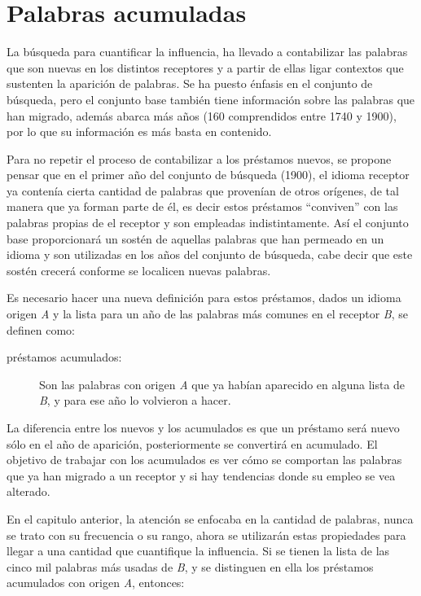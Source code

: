 \chapter{Palabras acumuladas}

La búsqueda para cuantificar la influencia, ha llevado a contabilizar las palabras que son nuevas en los distintos receptores y a partir de ellas ligar contextos que sustenten la aparición de palabras.  Se ha puesto énfasis en el conjunto de búsqueda, pero  el conjunto base  también tiene información sobre las palabras que han migrado, además  abarca más años (160 comprendidos entre 1740 y 1900), por lo que su información es más basta en contenido. 

Para no repetir el proceso de contabilizar a los préstamos nuevos,  se propone pensar que en el primer año del conjunto de búsqueda (1900),  el idioma receptor ya contenía cierta cantidad de palabras que provenían de otros orígenes,  de tal manera que ya forman parte de él, es decir estos préstamos ``conviven'' con las palabras propias de el receptor y son empleadas indistintamente. Así el conjunto base proporcionará un sostén de aquellas palabras que han permeado en un idioma y son utilizadas en los años del conjunto de búsqueda,  cabe decir que este sostén crecerá conforme se localicen nuevas palabras. 

Es necesario hacer una nueva definición para estos préstamos, dados un idioma  origen  \textit{A} y la lista para un año  de las palabras más comunes en el receptor \textit{B}, se definen como: 

\begin{description}
	\item[préstamos acumulados:] Son las palabras con origen \textit{A} que ya habían aparecido en alguna lista de \textit{B}, y para ese año lo volvieron a hacer.  
\end{description}

La diferencia entre los nuevos y los acumulados es que un préstamo será nuevo sólo en el año de aparición, posteriormente se convertirá en acumulado. El objetivo  de trabajar con los acumulados es ver cómo se comportan las palabras que ya han migrado a un receptor y si hay tendencias donde su empleo se vea alterado.  

En el capitulo anterior, la atención se enfocaba en la cantidad de palabras, nunca se trato con su frecuencia o su rango, ahora se utilizarán estas propiedades  para llegar a una cantidad que cuantifique la influencia. Si se tienen la lista de las cinco mil palabras más usadas  de \textit{B}, y se distinguen en ella los préstamos acumulados con origen \textit{A}, entonces: 


